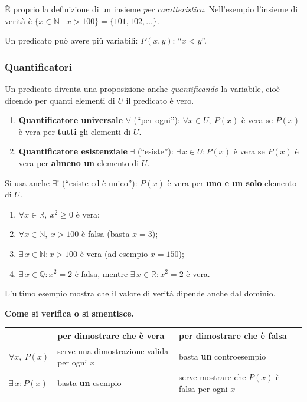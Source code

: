 \documentclass[11pt,a4paper]{article}
\begin{document}
È proprio la definizione di un insieme \emph{per caratteristica}. Nell'esempio
l'insieme di verità è $\{x \in \mathbb{N} \mid x > 100\} = \{101, 102, \dots\}$.

Un predicato può avere più variabili: $P(x, y)$: ``$x < y$''.

\subsubsection{Quantificatori}

Un predicato diventa una proposizione anche \emph{quantificando} la
variabile, cioè dicendo per quanti elementi di $U$ il predicato è vero.

\begin{definizione}
\begin{enumerate}
    \item \textbf{Quantificatore universale} $\forall$ (``per ogni''):
          $\forall x \in U,\ P(x)$ è vera se $P(x)$ è vera per
          \textbf{tutti} gli elementi di $U$.
    \item \textbf{Quantificatore esistenziale} $\exists$ (``esiste''):
          $\exists\, x \in U : P(x)$ è vera se $P(x)$ è vera per
          \textbf{almeno un} elemento di $U$.
\end{enumerate}
\end{definizione}

Si usa anche $\exists!$ (``esiste ed è unico''): $P(x)$ è vera per
\textbf{uno e un solo} elemento di $U$.

\begin{esempio}\mbox{}
\begin{enumerate}
    \item $\forall x \in \mathbb{R},\ x^2 \geq 0$ \quad è vera;
    \item $\forall x \in \mathbb{N},\ x > 100$ \quad è falsa (basta
          $x = 3$);
    \item $\exists\, x \in \mathbb{N} : x > 100$ \quad è vera (ad esempio
          $x = 150$);
    \item $\exists\, x \in \mathbb{Q} : x^2 = 2$ \quad è falsa, mentre
          $\exists\, x \in \mathbb{R} : x^2 = 2$ è vera.
\end{enumerate}
\end{esempio}

L'ultimo esempio mostra che il valore di verità dipende anche dal dominio.

\textbf{Come si verifica o si smentisce.}
\begin{center}
\begin{tabular}{l|p{5.2cm}|p{5.2cm}}
 & per dimostrare che è vera & per dimostrare che è falsa \\ \hline
$\forall x,\ P(x)$ & serve una dimostrazione valida per ogni $x$ &
basta \textbf{un} controesempio \\ \hline
$\exists\, x : P(x)$ & basta \textbf{un} esempio &
serve mostrare che $P(x)$ è falsa per ogni $x$
\end{tabular}
\end{center}
\end{document}
